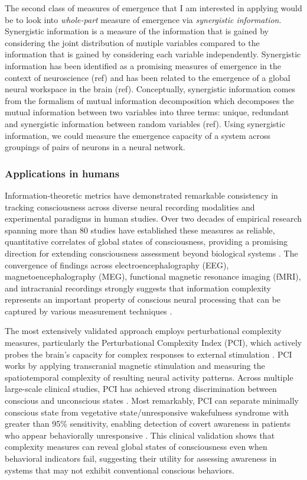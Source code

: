 \documentclass[11pt,a4paper]{article}
\begin{document}
The second class of measures of emergence that I am interested in applying would be to look into \textit{whole-part} measure of emergence via \textit{synergistic information}. Synergistic information is a measure of the information that is gained by considering the joint distribution of mutiple variables compared to the information that is gained by considering each variable independently. Synergistic information has been identified as a promising measures of emergence in the context of neuroscience (ref) and has been related to the emergence of a global neural workspace in the brain (ref). Conceptually, synergistic information comes from the formalism of mutual information decomposition which decomposes the mutual information between two variables into three terms: unique, redundant and synergistic information between random variables (ref). Using synergistic information, we could measure the emergence capacity of a system across groupings of pairs of neurons in a neural network.

\subsubsection{Applications in humans}

Information-theoretic metrics have demonstrated remarkable consistency in tracking consciousness across diverse neural recording modalities and experimental paradigms in human studies. Over two decades of empirical research spanning more than 80 studies have established these measures as reliable, quantitative correlates of global states of consciousness, providing a promising direction for extending consciousness assessment beyond biological systems \citep{Casali2013, Schartner2015, Sarasso2021}. The convergence of findings across electroencephalography (EEG), magnetoencephalography (MEG), functional magnetic resonance imaging (fMRI), and intracranial recordings strongly suggests that information complexity represents an important property of conscious neural processing that can be captured by various measurement techniques \citep{Zhang2001, Liu2019, Luppi2022}.

The most extensively validated approach employs perturbational complexity measures, particularly the Perturbational Complexity Index (PCI), which actively probes the brain's capacity for complex responses to external stimulation \citep{Casali2013, Casarotto2016}. PCI works by applying transcranial magnetic stimulation and measuring the spatiotemporal complexity of resulting neural activity patterns. Across multiple large-scale clinical studies, PCI has achieved strong discrimination between conscious and unconscious states \citep{Sarasso2015, Casarotto2016}. Most remarkably, PCI can separate minimally conscious state from vegetative state/unresponsive wakefulness syndrome with greater than 95\% sensitivity, enabling detection of covert awareness in patients who appear behaviorally unresponsive \citep{Casarotto2016}. This clinical validation shows that complexity measures can reveal global states of consciousness even when behavioral indicators fail, suggesting their utility for assessing awareness in systems that may not exhibit conventional conscious behaviors.
\end{document}
